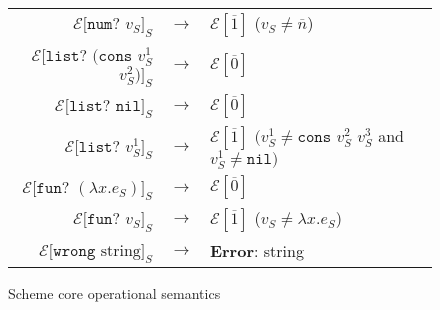 \begin{figure}[p]
\begin{tabular}{rcl}
$\mathscr{E}[\mathtt{num?}$ $v_{S}]_{S}$ & $\rightarrow$ & $\mathscr{E}[\overline{1}]$ ($v_{S}\neq\overline{n}$) \\
$\mathscr{E}[\mathtt{list?}$ $(\mathtt{cons}$ $v_{S}^{1}$ $v_{S}^{2})]_{S}$ & $\rightarrow$ & $\mathscr{E}[\overline{0}]$ \\
$\mathscr{E}[\mathtt{list?}$ $\mathtt{nil}]_{S}$ & $\rightarrow$ & $\mathscr{E}[\overline{0}]$ \\
$\mathscr{E}[\mathtt{list?}$ $v_{S}^{1}]_{S}$ & $\rightarrow$ & $\mathscr{E}[\overline{1}]$ $(v_{S}^{1}\neq\mathtt{cons}$ $v_{S}^{2}$ $v_{S}^{3}$ and $v_{S}^{1}\neq\mathtt{nil})$ \\
$\mathscr{E}[\mathtt{fun?}$ $(\lambda x.e_{S})]_{S}$ & $\rightarrow$ & $\mathscr{E}[\overline{0}]$ \\
$\mathscr{E}[\mathtt{fun?}$ $v_{S}]_{S}$ & $\rightarrow$ & $\mathscr{E}[\overline{1}]$ ($v_{S}\neq\lambda x.e_{S}$) \\
$\mathscr{E}[\mathtt{wrong}$ $\mathrm{string}]_{S}$ & $\rightarrow$ & \textbf{Error}: string
\end{tabular}
\caption{Scheme core operational semantics}
\label{scos}
\end{figure}